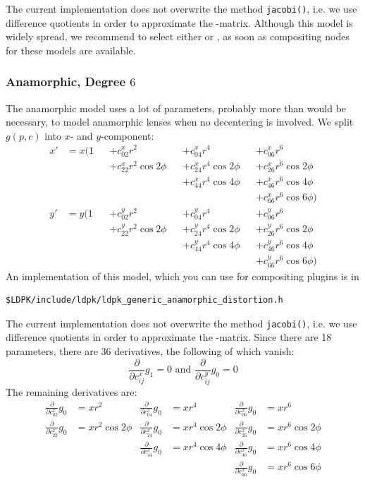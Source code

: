 \documentclass[10pt,a4paper]{article}
\begin{document}
The current implementation does not overwrite the method {\tt jacobi()}, i.e.
we use difference quotients in order to approximate the \Jacobi-matrix.
Although this model is widely spread, we recommend to
select either  or ,
as soon as compositing nodes for these models are available.

\subsubsection{Anamorphic, Degree $6$}
The anamorphic model uses a lot of parameters, probably more than would be necessary,
to model anamorphic lenses when no decentering is involved.
We split $g(p,c)$ into $x$- and $y$-component:
\begin{align}
x'	&= x(1	&&+ c^x_{02} r^2 &&+ c^x_{04} r^4 &&+ c^x_{06} r^6 \nonumber\\
	&	&&+ c^x_{22} r^2 \cos{2\phi} &&+ c^x_{24} r^4 \cos{2\phi} &&+ c^x_{26} r^6 \cos{2\phi} \nonumber\\
	&	&& &&+ c^x_{44} r^4 \cos{4\phi} &&+ c^x_{46} r^6 \cos{4\phi} \nonumber\\
	&	&& && &&+ c^x_{66} r^6 \cos{6\phi})\nonumber\\
y'	&= y(1	&&+ c^y_{02} r^2 &&+ c^y_{04} r^4 &&+ c^y_{06} r^6 \nonumber\\
	&	&&+ c^y_{22} r^2 \cos{2\phi} &&+ c^y_{24} r^4 \cos{2\phi} &&+ c^y_{26} r^6 \cos{2\phi} \nonumber\\
	&	&& &&+ c^y_{44} r^4 \cos{4\phi} &&+ c^y_{46} r^6 \cos{4\phi} \nonumber\\
	&	&& && &&+ c^y_{66} r^6 \cos{6\phi})
\end{align}
An implementation of this model, which you can use for compositing plugins is in
\begin{verbatim}
$LDPK/include/ldpk/ldpk_generic_anamorphic_distortion.h
\end{verbatim}
The current implementation does not overwrite the method {\tt jacobi()}, i.e.
we use difference quotients in order to approximate the \Jacobi-matrix.
Since there are 18 parameters, there are 36 derivatives,
the following of which vanish:
\begin{equation}
\frac \partial {\partial c^x_{ij}} g_1 = 0\text{\ and\ } \frac \partial {\partial c^y_{ij}} g_0 = 0
\end{equation}
The remaining derivatives are:
\begin{align}
\frac \partial {\partial c^x_{02}} g_0 &= x r^2 &
\frac \partial {\partial c^x_{04}} g_0 &= x r^4 &
\frac \partial {\partial c^x_{06}} g_0 &= x r^6 \nonumber\\
\frac \partial {\partial c^x_{22}} g_0 &= x r^2 \cos{2\phi} &
\frac \partial {\partial c^x_{24}} g_0 &= x r^4 \cos{2\phi} &
\frac \partial {\partial c^x_{26}} g_0 &= x r^6 \cos{2\phi} \nonumber\\
& & \frac \partial {\partial c^x_{44}} g_0 &= x r^4 \cos{4\phi} &
\frac \partial {\partial c^x_{46}} g_0 &= x r^6 \cos{4\phi} \nonumber\\
& & & & \frac \partial {\partial c^x_{66}} g_0 &= x r^6 \cos{6\phi} \nonumber
\end{align}
\end{document}

